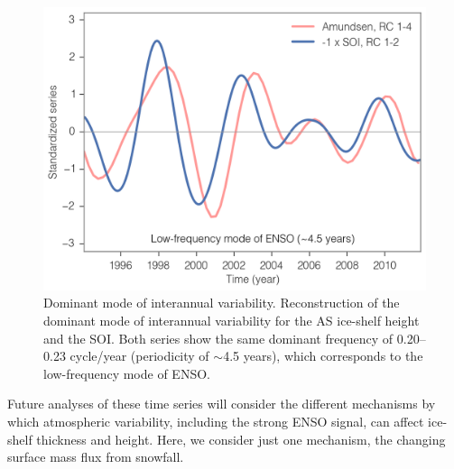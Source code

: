 \begin{figure}[!ht]
  \centering
  \includegraphics[width=.72\textwidth]{img/amu_soi_modes.png}
  \caption[Dominant mode of interannual variability]{
  \ssp \footnotesize
  Dominant mode of interannual variability. Reconstruction of the dominant mode of interannual variability for the AS ice-shelf height and the SOI. Both series show the same dominant frequency of 0.20--0.23 cycle/year (periodicity of $\sim$4.5 years), which corresponds to the low-frequency mode of ENSO.
  }
  \label{c4f9}
\end{figure}


Future analyses of these time series will consider the different mechanisms by which atmospheric variability, including the strong ENSO signal, can affect ice-shelf thickness and height. Here, we consider just one mechanism, the changing surface mass flux from snowfall.


